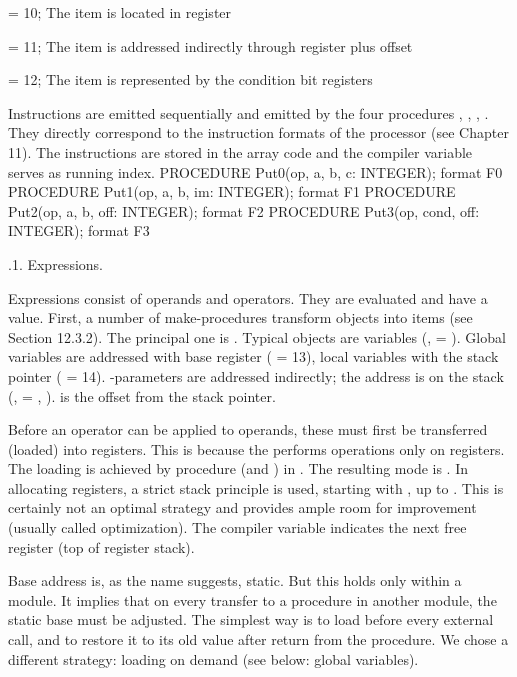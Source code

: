 \item{\bullet}  = 10; The item  is located in register 
\item{\bullet}  = 11; The item  is addressed indirectly through register  plus offset 
\item{\bullet}  = 12; The item is represented by the condition bit registers

\noindent Instructions are emitted sequentially and emitted by the four procedures , , , . They directly correspond to the instruction formats of the \RISC processor (see Chapter 11). The instructions are stored in the array code and the compiler variable  serves as running index.
\begintt
PROCEDURE Put0(op, a, b, c: INTEGER); format F0
PROCEDURE Put1(op, a, b, im: INTEGER); format F1
PROCEDURE Put2(op, a, b, off: INTEGER); format F2
PROCEDURE Put3(op, cond, off: INTEGER); format F3
\endtt

.1. Expressions.

Expressions consist of operands and operators. They are evaluated and have a value. First, a number of make-procedures transform objects into items (see Section 12.3.2). The principal one is . Typical objects are variables (,  = ). Global variables are addressed with base register  ( = 13), local variables with the stack pointer  ( = 14). -parameters are addressed indirectly; the address is on the stack (,  = , ).  is the offset from the stack pointer.

Before an operator can be applied to operands, these must first be transferred (loaded) into registers. This is because the \RISC performs operations only on registers. The loading is achieved by procedure  (and ) in . The resulting mode is . In allocating registers, a strict stack principle is used, starting with , up to . This is certainly not an optimal strategy and provides ample room for improvement (usually called optimization). The compiler variable  indicates the next free register (top of register stack).

Base address  is, as the name suggests, static. But this holds only within a module. It implies that on every transfer to a procedure in another module, the static base must be adjusted. The simplest way is to load  before every external call, and to restore it to its old value after return from the procedure. We chose a different strategy: loading on demand (see below: global variables).

